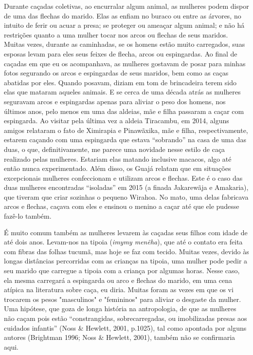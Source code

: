Durante caçadas coletivas, ao encurralar algum animal, as mulheres podem
dispor de uma das flechas do marido. Elas as enfiam no buraco ou entre
as árvores, no intuito de ferir ou acuar a presa; se proteger ou ameaçar
algum animal; e não há restrições quanto a uma mulher tocar nos arcos ou
flechas de seus maridos. Muitas vezes, durante as caminhadas, se os
homens estão muito carregados, suas esposas levam para eles seus feixes
de flecha, arcos ou espingardas. Ao final de caçadas em que eu os
acompanhava, as mulheres gostavam de posar para minhas fotos segurando
os arcos e espingardas de seus maridos, bem como as caças abatidas por
eles. Quando posavam, diziam em tom de brincadeira terem sido elas que
mataram aqueles animais. E se cerca de uma década atrás as mulheres
seguravam arcos e espingardas apenas para aliviar o peso dos homens, nos
últimos anos, pelo menos em uma das aldeias, mãe e filha passaram a
caçar com espingarda. Ao visitar pela última vez a aldeia Tiracambu, em
2014, alguns amigos relataram o fato de Ximirapia e Pinawãxika, mãe e
filha, respectivamente, estarem caçando com uma espingarda que estava
``sobrando'' na casa de uma das duas, o que, definitivamente, me parece
uma novidade nesse estilo de caça realizado pelas mulheres. Estariam
elas matando inclusive macacos, algo até então nunca experimentado. Além
disso, os Guajá relatam que em situações excepcionais mulheres
confeccionam e utilizam arcos e flechas. Este é o caso das duas mulheres
encontradas ``isoladas'' em 2015 (a finada Jakarewãja e Amakaria), que
tiveram que criar sozinhas o pequeno Wirahoa. No mato, uma delas
fabricava arcos e flechas, caçava com eles e ensinou o menino a caçar
até que ele pudesse fazê-lo também.

É muito comum também as mulheres levarem às caçadas seus filhos com
idade de até dois anos. Levam-nos na tipoia (\emph{imymy menẽha}), que
até o contato era feita com fibras das folhas tucumã, mas hoje se faz
com tecido. Muitas vezes, devido às longas distâncias percorridas com as
crianças na tipoia, uma mulher pode pedir a seu marido que carregue a
tipoia com a criança por algumas horas. Nesse caso, ela mesma carregará
a espingarda ou arco e flechas do marido, em uma cena atípica na
literatura sobre caça, eu diria. Muitas foram as vezes em que os vi
trocarem os pesos "masculinos" e "femininos" para aliviar o desgaste da
mulher. Uma hipótese, que goza de longa história na antropologia, de que
as mulheres não caçam pois estão ``constrangidas, sobrecarregadas, ou
imobilizadas presas aos cuidados infantis'' (Noss \& Hewlett, 2001,
p.1025), tal como apontada por alguns autores (Brightman 1996; Noss \&
Hewlett, 2001), também não se confirmaria aqui.

